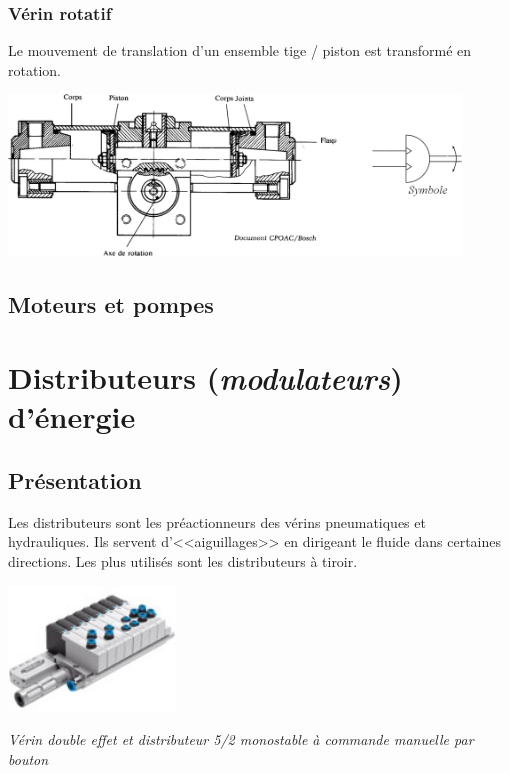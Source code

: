 \documentclass[10pt]{article}
\begin{document}
\subsubsection{Vérin rotatif}

Le mouvement de translation d’un ensemble tige / piston est transformé en rotation.

\begin{center}
\includegraphics[width=12cm]{images/Fig_06_VerinRot}
\end{center}


\subsection{Moteurs et pompes}

\section{Distributeurs (\textit{modulateurs}) d'énergie}
\subsection{Présentation}



\begin{minipage}[c]{.6\textwidth}
Les distributeurs sont les préactionneurs des vérins pneumatiques et hydrauliques.
Ils servent d’<<aiguillages>> en dirigeant le fluide dans certaines directions.
Les plus utilisés sont les distributeurs à tiroir.

\end{minipage} \hfill
\begin{minipage}[c]{.37\textwidth}
\begin{center}
\includegraphics[width=.75\textwidth]{images/distributeur_festo}

\textit{Vérin double effet et distributeur 5/2 monostable à commande manuelle par bouton}
\end{center}
\end{minipage}
\end{document}
